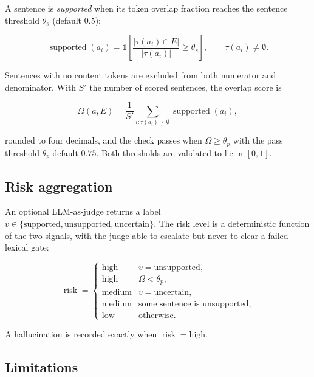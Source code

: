 A sentence is \emph{supported} when its token overlap fraction reaches the
sentence threshold $\theta_s$ (default $0.5$):

\begin{equation}
\operatorname{supported}(a_i) =
  \mathbb{1}\!\left[
    \frac{|\tau(a_i) \cap E|}{|\tau(a_i)|} \geq \theta_s
  \right],
\qquad \tau(a_i) \neq \emptyset .
\end{equation}

Sentences with no content tokens are excluded from both numerator and
denominator. With $S'$ the number of scored sentences, the overlap score is

\begin{equation}
\Omega(a, E) = \frac{1}{S'}\sum_{i : \tau(a_i) \neq \emptyset}
  \operatorname{supported}(a_i),
\end{equation}

rounded to four decimals, and the check passes when
$\Omega \geq \theta_p$ with the pass threshold $\theta_p$ default $0.75$. Both
thresholds are validated to lie in $[0,1]$.

\subsection*{Risk aggregation}

An optional LLM-as-judge returns a label
$v \in \{\text{supported}, \text{unsupported}, \text{uncertain}\}$. The risk
level is a deterministic function of the two signals, with the judge able to
escalate but never to clear a failed lexical gate:

\begin{equation}
\operatorname{risk} =
\begin{cases}
  \text{high}   & v = \text{unsupported},\\
  \text{high}   & \Omega < \theta_p,\\
  \text{medium} & v = \text{uncertain},\\
  \text{medium} & \text{some sentence is unsupported},\\
  \text{low}    & \text{otherwise.}
\end{cases}
\end{equation}

A hallucination is recorded exactly when $\operatorname{risk} = \text{high}$.

\subsection*{Limitations}


